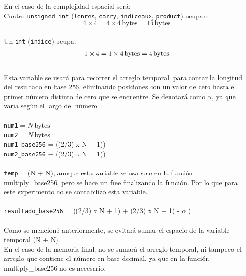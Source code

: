 \documentclass[10pt]{article}
\begin{document}
En el caso de la complejidad espacial será:\\
Cuatro \texttt{unsigned int} (\texttt{lenres}, \texttt{carry}, \texttt{indiceaux}, \texttt{product}) ocupan:
\[
4 \times 4 = 4 \times 4 \, \text{bytes} = 16 \, \text{bytes}
\] \\
Un \texttt{int} (\texttt{indice}) ocupa:
\[
1 \times 4 = 1 \times 4 \, \text{bytes} = 4 \, \text{bytes} \\
\] \\
Esta variable se usará para recorrer el arreglo temporal, para contar la longitud del resultado en base 256, eliminando posiciones con un valor de cero hasta el primer número distinto de cero que se encuentre. Se denotará como $\alpha$, ya que varía según el largo del número.\\\\
\texttt{num1} = \(N \, \text{bytes}\) \\
\texttt{num2} = \(N \, \text{bytes}\) \\
\texttt{num1\_base256} = ((2/3) x N + 1))  \\
\texttt{num2\_base256} = ((2/3) x N + 1))  \\\\
\texttt{temp} = (N + N), aunque esta variable se usa solo en la función multiply\_base256, pero se hace un free finalizando la función. Por lo que para este experimento no se contabilizó esta variable. \\\\
\texttt{resultado\_base256} = ((2/3) x N + 1) + (2/3) x N + 1) - $\alpha$ )  \\\\
Como se mencionó anteriormente, se evitará sumar el espacio de la variable temporal (N + N).\\
En el caso de la memoria final, no se sumará el arreglo temporal, ni tampoco el arreglo que contiene el número en base decimal, ya que en la función multiply\_base256 no es necesario.
\end{document}
